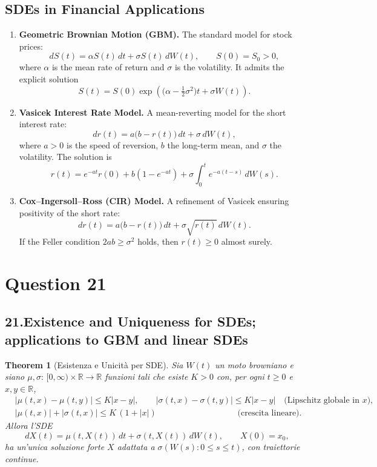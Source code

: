\documentclass[12pt,a4paper]{book}
\newtheorem{theorem}{Theorem}[chapter]
\theoremstyle{remark}
\begin{document}
\subsection*{SDEs in Financial Applications}
\begin{enumerate}
    \item \textbf{Geometric Brownian Motion (GBM).}  
    The standard model for stock prices:
    \[
    dS(t) = \alpha S(t)\,dt + \sigma S(t)\,dW(t), \qquad S(0) = S_0 > 0,
    \]
    where $\alpha$ is the mean rate of return and $\sigma$ is the volatility.  
    It admits the explicit solution
    \[
    S(t) = S(0)\exp\!\left( \Big(\alpha - \tfrac{1}{2}\sigma^2\Big)t + \sigma W(t)\right).
    \]

    \item \textbf{Vasicek Interest Rate Model.}  
    A mean-reverting model for the short interest rate:
    \[
    dr(t) = a\big(b-r(t)\big)\,dt + \sigma\,dW(t),
    \]
    where $a > 0$ is the speed of reversion, $b$ the long-term mean, and $\sigma$ the volatility.  
    The solution is
    \[
    r(t) = e^{-at}r(0) + b(1-e^{-at}) + \sigma \int_0^t e^{-a(t-s)}\,dW(s).
    \]

    \item \textbf{Cox–Ingersoll–Ross (CIR) Model.}  
    A refinement of Vasicek ensuring positivity of the short rate:
    \[
    dr(t) = a\big(b-r(t)\big)\,dt + \sigma\sqrt{r(t)}\,dW(t).
    \]
    If the Feller condition $2ab \geq \sigma^2$ holds, then $r(t) \geq 0$ almost surely.
\end{enumerate}






\newpage
\section{Question 21}
\subsection*{21.\;Existence and Uniqueness for SDEs; applications to GBM and linear SDEs}

\begin{theorem}[Esistenza e Unicità per SDE]\label{thm:EU-SDE}
Sia $W(t)$ un moto browniano e siano $\mu,\sigma:\,[0,\infty)\times\mathbb{R}\to\mathbb{R}$ funzioni tali che esiste $K>0$ con, per ogni $t\ge 0$ e $x,y\in\mathbb{R}$,
\begin{align*}
&|\mu(t,x)-\mu(t,y)| \le K|x-y|, \qquad |\sigma(t,x)-\sigma(t,y)| \le K|x-y| \quad\text{(Lipschitz globale in $x$)},\\
&|\mu(t,x)|+|\sigma(t,x)| \le K\,(1+|x|) \qquad\qquad\qquad\qquad\quad\;\;\text{(crescita lineare).}
\end{align*}
Allora l'SDE
\[
dX(t)=\mu(t,X(t))\,dt+\sigma(t,X(t))\,dW(t),\qquad X(0)=x_0,
\]
ha un'unica soluzione forte $X$ adattata a $\sigma(W(s):0\le s\le t)$, con traiettorie continue. %
\end{theorem}
\end{document}
